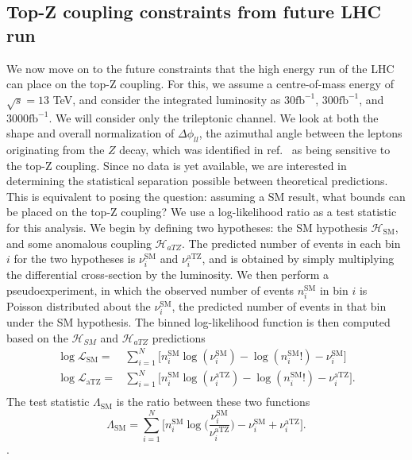 \documentclass[preprint]{JHEP3} %
\newcommand{\SM}{\mathrm{SM}}
\newcommand{\aTZ}{\mathrm{aTZ}}
\def\Dphill{\Delta \phi_{ll}}
\def\invfb {\mathrm{fb}^{-1}}
\begin{document}
\subsection{Top-Z coupling constraints from future LHC run}
We now move on to the future constraints that the high energy run of the LHC can place on the top-Z coupling. For this, we assume a centre-of-mass energy of $\sqrt{s}=13$ TeV, and consider the integrated luminosity as $30 \invfb$, $300 \invfb$, and $3000 \invfb$. We will consider only the trileptonic channel. We look at both the shape and overall normalization of $\Dphill$, the azimuthal angle between the leptons originating from the $Z$ decay, which was identified in ref.~\cite{baur} as being sensitive to the top-Z coupling. 
Since no data is yet available, we are interested in determining the statistical separation possible between theoretical predictions. This is equivalent to posing the question: assuming a SM result, what bounds can be placed on the top-Z coupling? 
We use a log-likelihood ratio as a test statistic for this analysis. We begin by defining two hypotheses: the SM hypothesis $\mathcal{H}_{\mathrm{SM}}$, and some anomalous coupling $\mathcal{H}_{aTZ}$. The predicted number of events in each bin $i$ for the two hypotheses is $\nu_i^{\mathrm{SM}}$ and $\nu_i^{\aTZ}$, and is obtained by simply multiplying the differential cross-section by the luminosity. We then perform a pseudoexperiment, in which the observed number of events $n_i^{\SM}$ in bin $i$ is Poisson distributed about the $\nu_i^{\mathrm{SM}}$, the predicted number of events in that bin under the SM hypothesis.  The binned log-likelihood function is then computed based on the $\mathcal{H}_{SM}$ and $\mathcal{H}_{aTZ}$ predictions
\begin{equation}
\begin{split}
\log\mathcal{L}_{\SM}  =& \sum_{i=1}^N \bigl[ n_i^{\SM}\log(\nu_i^{\SM})-\log(n_i^{\SM}!) -\nu_i^{\SM} \bigr] \\
\log\mathcal{L}_{\aTZ}  =& \sum_{i=1}^N \bigl[ n_i^{\SM}\log(\nu_i^{\aTZ})-\log(n_i^{\SM}!) -\nu_i^{\aTZ} \bigr]. \\
\end{split}
\end{equation}
The test statistic $\Lambda_{\SM}$ is the ratio between these two functions 
\begin{equation}
\Lambda_{\SM} = \sum_{i=1}^N \bigl[ n_i^{\SM}\log \bigl( \frac{\nu_i^{\SM}}{\nu_i^{\aTZ}} \bigr) -\nu_i^{\SM} + \nu_i^{\aTZ} \bigr]. 
\end{equation}.
\end{document}
